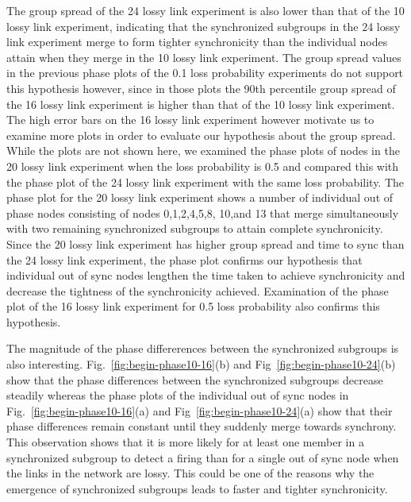 \noindent
The group spread of the 24 lossy link experiment is also lower than that of the 10 lossy link experiment, indicating
that the synchronized subgroups in the 24 lossy link experiment merge to form tighter synchronicity than the individual 
nodes attain when they merge in the 10 lossy link experiment. The group spread values in the previous phase plots
of the 0.1 loss probability experiments do not support this hypothesis however, since in those plots the 90th 
percentile group spread of the 16 lossy link experiment is higher than that of the 10 lossy link
experiment. The high error bars on the 16 lossy link experiment however motivate us to examine more plots in order 
to evaluate our hypothesis about the group spread.
While the plots are not shown here, we examined the phase plots of nodes in the 20 lossy link experiment when the 
loss probability is 0.5 and compared this with the phase plot of the 24 lossy link experiment with the same loss 
probability.  The phase plot for the 20 lossy link experiment shows a number of individual out of phase nodes
consisting of nodes 0,1,2,4,5,8, 10,and 13 that merge simultaneously with two remaining synchronized subgroups
to attain complete synchronicity.  Since the 20 lossy link experiment has higher group spread and time to sync
than the 24 lossy link experiment, the phase plot confirms our hypothesis that individual out of sync nodes
lengthen the time taken to achieve synchronicity and decrease the tightness of the synchronicity achieved.
Examination of the phase plot of the 16 lossy link experiment for 0.5 loss probability also confirms this hypothesis. \newline

\noindent
The magnitude of the phase differerences between the synchronized subgroups is also interesting. 
Fig.~\ref{fig:begin-phase10-16}(b) and Fig~\ref{fig:begin-phase10-24}(b) show that the phase differences
between the synchronized subgroups decrease steadily whereas the phase plots of the individual out of sync
nodes in Fig.~\ref{fig:begin-phase10-16}(a) and Fig~\ref{fig:begin-phase10-24}(a) show that their phase
differences remain constant until they suddenly merge towards synchrony.  This observation shows that it is
more likely for at least one member in a synchronized subgroup to detect a firing than for a single out of sync
node when the links in the network are lossy.  This could be one of the reasons why the emergence of synchronized
subgroups leads to faster and tighter synchronicity.


